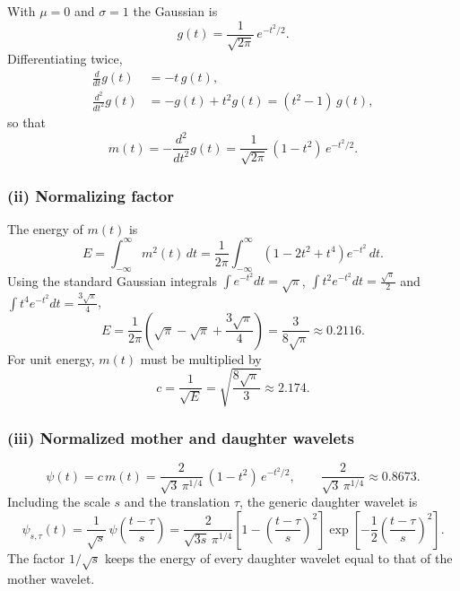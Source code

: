 \documentclass[11pt,a4paper]{article}
\begin{document}
With $\mu = 0$ and $\sigma = 1$ the Gaussian is
\begin{equation}
    g(t) = \frac{1}{\sqrt{2\pi}}\, e^{-t^2/2}.
\end{equation}
Differentiating twice,
\begin{align}
    \frac{d}{dt} g(t)     &= -t\, g(t), \\
    \frac{d^2}{dt^2} g(t) &= -g(t) + t^2 g(t) = (t^2 - 1)\, g(t),
\end{align}
so that
\begin{equation}
    m(t) = -\frac{d^2}{dt^2} g(t) = \frac{1}{\sqrt{2\pi}}\,(1 - t^2)\, e^{-t^2/2}.
\end{equation}

\subsubsection*{(ii) Normalizing factor}

The energy of $m(t)$ is
\begin{equation}
    E = \int_{-\infty}^{\infty} m^2(t)\,dt
      = \frac{1}{2\pi}\int_{-\infty}^{\infty} \left(1 - 2t^2 + t^4\right) e^{-t^2}\,dt .
\end{equation}
Using the standard Gaussian integrals
$\int e^{-t^2}dt = \sqrt{\pi}$,
$\int t^2 e^{-t^2}dt = \tfrac{\sqrt{\pi}}{2}$ and
$\int t^4 e^{-t^2}dt = \tfrac{3\sqrt{\pi}}{4}$,
\begin{equation}
    E = \frac{1}{2\pi}\left(\sqrt{\pi} - \sqrt{\pi} + \frac{3\sqrt{\pi}}{4}\right)
      = \frac{3}{8\sqrt{\pi}} \approx 0.2116 .
\end{equation}
For unit energy, $m(t)$ must be multiplied by
\begin{equation}
    c = \frac{1}{\sqrt{E}} = \sqrt{\frac{8\sqrt{\pi}}{3}} \approx 2.174 .
\end{equation}

\subsubsection*{(iii) Normalized mother and daughter wavelets}

\begin{equation}
    \psi(t) = c\, m(t) = \frac{2}{\sqrt{3}\,\pi^{1/4}}\,(1 - t^2)\, e^{-t^2/2},
    \qquad \frac{2}{\sqrt{3}\,\pi^{1/4}} \approx 0.8673 .
\end{equation}
Including the scale $s$ and the translation $\tau$, the generic daughter wavelet is
\begin{equation}
    \psi_{s,\tau}(t) = \frac{1}{\sqrt{s}}\,\psi\!\left(\frac{t-\tau}{s}\right)
    = \frac{2}{\sqrt{3s}\,\pi^{1/4}}
      \left[1 - \left(\frac{t-\tau}{s}\right)^{2}\right]
      \exp\!\left[-\frac{1}{2}\left(\frac{t-\tau}{s}\right)^{2}\right].
\end{equation}
The factor $1/\sqrt{s}$ keeps the energy of every daughter wavelet equal to that of the mother wavelet.
\end{document}

